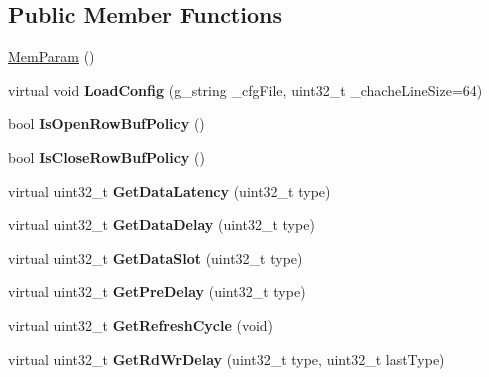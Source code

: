 \subsection*{Public Member Functions}
\begin{DoxyCompactItemize}
\item 
\hyperlink{classMemParam_a85006f1c80158d176a10a867cc8393e8}{Mem\-Param} ()
\item 
\hypertarget{classMemParam_a881d234c7cbfd73c252abedd51d2a6ff}{virtual void {\bfseries Load\-Config} (g\-\_\-string \-\_\-cfg\-File, uint32\-\_\-t \-\_\-chache\-Line\-Size=64)}\label{classMemParam_a881d234c7cbfd73c252abedd51d2a6ff}

\item 
\hypertarget{classMemParam_a82748bb38598ad9aaebb7aa1e981a718}{bool {\bfseries Is\-Open\-Row\-Buf\-Policy} ()}\label{classMemParam_a82748bb38598ad9aaebb7aa1e981a718}

\item 
\hypertarget{classMemParam_a2809795fb8a5862894b77528df8d74a6}{bool {\bfseries Is\-Close\-Row\-Buf\-Policy} ()}\label{classMemParam_a2809795fb8a5862894b77528df8d74a6}

\item 
\hypertarget{classMemParam_a2a71a44e4e853453a0e00384674523ef}{virtual uint32\-\_\-t {\bfseries Get\-Data\-Latency} (uint32\-\_\-t type)}\label{classMemParam_a2a71a44e4e853453a0e00384674523ef}

\item 
\hypertarget{classMemParam_a0852c64cadacd3690e22023aab757231}{virtual uint32\-\_\-t {\bfseries Get\-Data\-Delay} (uint32\-\_\-t type)}\label{classMemParam_a0852c64cadacd3690e22023aab757231}

\item 
\hypertarget{classMemParam_ad179313faebb4718eff9a063828892cd}{virtual uint32\-\_\-t {\bfseries Get\-Data\-Slot} (uint32\-\_\-t type)}\label{classMemParam_ad179313faebb4718eff9a063828892cd}

\item 
\hypertarget{classMemParam_a6fccdb2e6533b4e2a68a016fa6007591}{virtual uint32\-\_\-t {\bfseries Get\-Pre\-Delay} (uint32\-\_\-t type)}\label{classMemParam_a6fccdb2e6533b4e2a68a016fa6007591}

\item 
\hypertarget{classMemParam_ac09217459346079151a2bf0756844710}{virtual uint32\-\_\-t {\bfseries Get\-Refresh\-Cycle} (void)}\label{classMemParam_ac09217459346079151a2bf0756844710}

\item 
\hypertarget{classMemParam_a095f8a3f720e996f47fe45afc930b3e2}{virtual uint32\-\_\-t {\bfseries Get\-Rd\-Wr\-Delay} (uint32\-\_\-t type, uint32\-\_\-t last\-Type)}\label{classMemParam_a095f8a3f720e996f47fe45afc930b3e2}

\end{DoxyCompactItemize}
